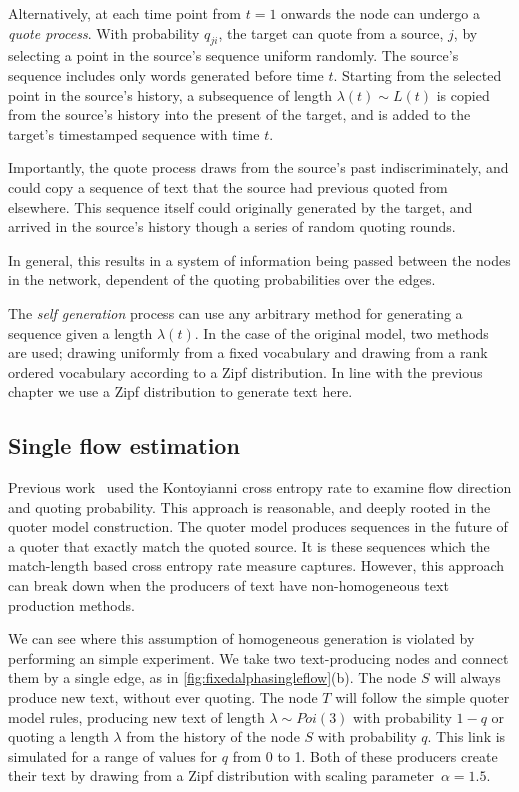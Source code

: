 Alternatively, at each time point from $t=1$ onwards the node can undergo a \emph{quote process}. With probability $q_{ji}$, the target can quote from a source, $j$, by selecting a point in the source's sequence uniform randomly. The source's sequence includes only words generated before time $t$. Starting from the selected point in the source's history, a subsequence of length $\lambda(t) \sim L(t)$ is copied from the source's history into the present of the target, and is added to the target's timestamped sequence with time $t$.

Importantly, the quote process draws from the source's past indiscriminately, and could copy a sequence of text that the source had previous quoted from elsewhere. This sequence itself could originally generated by the target, and arrived in the source's history though a series of random quoting rounds. 

In general, this results in a system of information being passed between the nodes in the network, dependent of the quoting probabilities over the edges.

The \emph{self generation} process can use any arbitrary method for generating a sequence given a length $\lambda(t)$. In the case of the original model, two methods are used; drawing uniformly from a fixed vocabulary and drawing from a rank ordered vocabulary according to a Zipf distribution. In line with the previous chapter we use a Zipf distribution to generate text here.


\subsection{Single flow estimation} 

Previous work~\cite{bagrow_quoter_2018} used the Kontoyianni cross entropy rate to examine flow direction and quoting probability. This approach is reasonable, and deeply rooted in the quoter model construction. The quoter model produces sequences in the future of a quoter that exactly match the quoted source. It is these sequences which the match-length based cross entropy rate measure captures. However, this approach can break down when the producers of text have non-homogeneous text production methods.

We can see where this assumption of homogeneous generation is violated by performing an simple experiment. We take two text-producing nodes and connect them by a single edge, as in \autoref{fig:fixedalphasingleflow}(b). The node $S$ will always produce new text, without ever quoting. The node $T$ will follow the simple quoter model rules, producing new text of length $\lambda \sim Poi(3)$ with probability $1-q$ or quoting a length $\lambda$ from the history of the node $S$ with probability $q$. This link is simulated for a range of values for $q$ from 0 to 1. Both of these producers create their text by drawing from a Zipf distribution with scaling parameter~$\alpha=1.5$.

